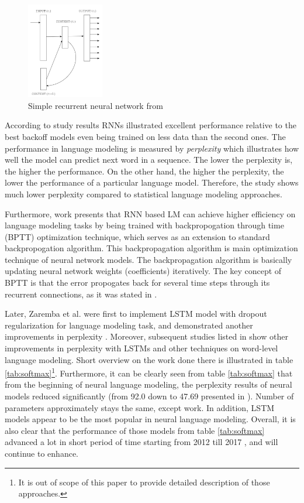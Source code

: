 \documentclass{IEEEtran}
\begin{document}
\begin{figure}[h]
	\centering
	\includegraphics[width=0.3\textwidth]{rnn}
	\caption{Simple recurrent neural network from \cite{Mikolov2010NeuralLM}}
	\label{fig:rnn}
\end{figure}

According to \cite{Mikolov2010NeuralLM} study results RNNs illustrated excellent performance relative to the best backoff models even being trained on less data than the second ones. The performance in language modeling is measured by \textit{perplexity} which illustrates how well the model can predict next word in a sequence. The lower the perplexity is, the higher the performance. On the other hand, the higher the perplexity, the lower the performance of a particular language model. Therefore, the study shows much lower perplexity compared to statistical language modeling approaches.

Furthermore, \cite{Mikolov2011ExtensionsOR} work presents that RNN based LM can achieve higher efficiency on language modeling tasks by being trained with backpropogation through time (BPTT) optimization technique, which serves as an extension to standard backpropogation algorithm. This backpropagation algorithm is main optimization technique of neural network models. The backpropagation algorithm is basically updating neural network weights (coefficients) iteratively. The key concept of BPTT is that the error propogates back for several time steps through its recurrent connections, as it was stated in \cite{Mikolov2011ExtensionsOR}.

Later, Zaremba et al. were first to implement LSTM model with dropout regularization for language modeling task, and demonstrated another improvements in perplexity \cite{Zaremba2014LSTM}. Moreover, subsequent studies listed in \cite{Salakhutdinov2017Softmax} show other improvements in perplexity with LSTMs and other techniques on word-level language modeling. Short overview on the work done there is illustrated in table \ref{tab:softmax}\footnote{It is out of scope of this paper to provide detailed description of those approaches.}. Furthermore, it can be clearly seen from table \ref{tab:softmax} that from the beginning of neural language modeling, the perplexity results of neural models reduced significantly (from 92.0 down to 47.69 presented in \cite{Salakhutdinov2017Softmax}). Number of parameters approximately stays the same, except \cite{Mikolov2010NeuralLM} work. In addition, LSTM models appear to be the most popular in neural language modeling. Overall, it is also clear that the performance of those models from table \ref{tab:softmax} advanced a lot in short period of time starting from 2012 \cite{Mikolov2010NeuralLM} till 2017 \cite{Salakhutdinov2017Softmax}, and will continue to enhance.
\end{document}
